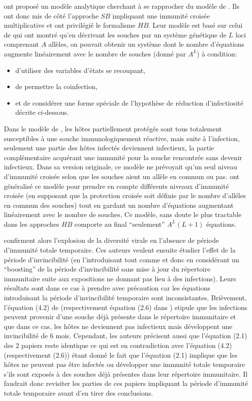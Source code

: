 \citet{Minayev2008, Minayev2009} ont proposé un modèle analytique
cherchant à se rapprocher du modèle de \citet{Ferguson2003}. Ils ont
donc mis de côté l'approche $SB$ impliquant une immunité croisée
multiplicative et ont privilégié le formalisme $HB$.  Leur modèle est
basé sur celui de \citet{Gupta1998} qui ont montré qu'en décrivant les
souches par un système génétique de $L$ loci comprenant $A$ allèles,
on pouvait obtenir un système dont le nombre d'équations augmente
linéairement avec le nombre de souches (donné par $A^L$) à condition:
\begin{itemize}
\item d'utiliser des variables d'états se recoupant,
\item de permettre la coinfection,
\item et de considérer une forme spéciale de l'hypothèse de
réduction d'infectiosité décrite ci-dessous. 
\end{itemize}
Dans le modèle de \citet{Gupta1998}, les hôtes partiellement protégés
sont tous totalement susceptibles à une souche immunologiquement
réactive, mais suite à l'infection, seulement une partie des hôtes
infectés deviennent infectieux, la partie complémentaire acquérant une
immunité pour la souche rencontrée sans devenir infectieux.  Dans sa
version originale, ce modèle ne prévoyait qu'un seul niveau d'immunité
croisée selon que les souches aient un allèle en commun ou pas.
\citet{Minayev2008} ont généralisé ce modèle pour prendre en compte
différents niveaux d'immunité croisée (en supposant que la protection
croisée soit définie par le nombre d'alléles en commun des souches)
tout en gardant un nombre d'équations augmentant linéairement avec le
nombre de souches. Ce modèle, sans doute le plus tractable dans les
approches $HB$ comporte au final ``seulement'' $A^L(L+1)$ équations.

\citet{Minayev2008, Minayev2009} confirment alors l'explosion de la
diversité virale en l'absence de période d'immunité totale temporaire.
Ces auteurs veulent ensuite étudier l'effet de la période
d'invincibilité (en l'introduisant tout comme \citet{Ferguson2003} et
donc en considérant un ``boosting'' de la période d'invincibilité sans
mise à jour du répertoire immunitaire suite aux expositions ne donnant
pas lieu à des infections). Leurs résultats sont dans ce cas à prendre
avec précaution car les équations introduisant la période
d'invincibilité temporaire sont inconsistantes.  Brièvement,
l'équation (4.2) de \citet{Minayev2008} (respectivement équation (2.6)
dans \citep{Minayev2009}) stipule que les infections peuvent provenir
d'une souche déjà présente dans le répertoire immunitaire et que dans
ce cas, les hôtes ne deviennent pas infectieux mais développent une
invincibilité de 6 mois.  Cependant, les auteurs précisent aussi que
l'équation (2.1) des 2 papiers reste identique ce qui est en
contradiction avec l'équation (4.2) (respectivement (2.6)) étant donné
le fait que l'équation (2.1) implique que les hôtes ne peuvent pas
être infectés ou développer une immunité totale temporaire s'ils sont
exposés à des souches déjà présentes dans leur répertoire
immunitaire. Il faudrait donc revisiter les parties de ces papiers
impliquant la période d'immunité totale temporaire avant d'en tirer
des conclusions.

